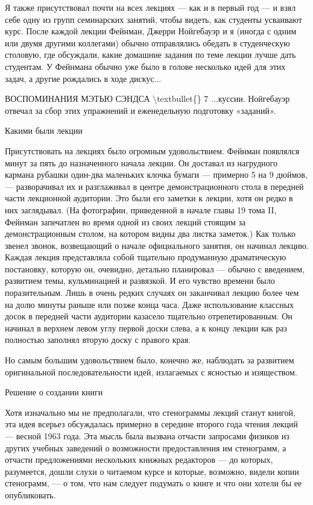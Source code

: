 \documentclass[10pt,oneside]{article}
\begin{document}
Я также присутствовал почти на всех лекциях --- как и в первый год --- и взял себе одну из групп семинарских занятий, чтобы видеть, как студенты усваивают курс. После каждой лекции Фейнман, Джерри Нойгебауэр и я (иногда с одним или двумя другими коллегами) обычно отправлялись обедать в студенческую столовую, где обсуждали, какие домашние задания по теме лекции лучше дать студентам. У Фейнмана обычно уже было в голове несколько идей для этих задач, а другие рождались в ходе дискус...\par

ВОСПОМИНАНИЯ МЭТЬЮ СЭНДСА \textbackslash{}textbullet\{\} 7 ...куссии. Нойгебауэр отвечал за сбор этих упражнений и еженедельную подготовку «заданий».\par

Какими были лекции\par

Присутствовать на лекциях было огромным удовольствием. Фейнман появлялся минут за пять до назначенного начала лекции. Он доставал из нагрудного кармана рубашки один-два маленьких клочка бумаги --- примерно 5 на 9 дюймов, --- разворачивал их и разглаживал в центре демонстрационного стола в передней части лекционной аудитории. Это были его заметки к лекции, хотя он редко в них заглядывал. (На фотографии, приведенной в начале главы 19 тома II, Фейнман запечатлен во время одной из своих лекций стоящим за демонстрационным столом, на котором видны два листка заметок.) Как только звенел звонок, возвещающий о начале официального занятия, он начинал лекцию. Каждая лекция представляла собой тщательно продуманную драматическую постановку, которую он, очевидно, детально планировал --- обычно с введением, развитием темы, кульминацией и развязкой. И его чувство времени было поразительным. Лишь в очень редких случаях он заканчивал лекцию более чем на долю минуты раньше или позже конца часа. Даже использование классных досок в передней части аудитории казасело тщательно отрепетированным. Он начинал в верхнем левом углу первой доски слева, а к концу лекции как раз полностью заполнял вторую доску с правого края.\par

Но самым большим удовольствием было, конечно же, наблюдать за развитием оригинальной последовательности идей, излагаемых с ясностью и изяществом.\par

Решение о создании книги\par

Хотя изначально мы не предполагали, что стенограммы лекций станут книгой, эта идея всерьез обсуждалась примерно в середине второго года чтения лекций --- весной 1963 года. Эта мысль была вызвана отчасти запросами физиков из других учебных заведений о возможности предоставления им стенограмм, а отчасти предложениями нескольких книжных редакторов --- до которых, разумеется, дошли слухи о читаемом курсе и которые, возможно, видели копии стенограмм, --- о том, что нам следует подумать о книге и что они хотели бы ее опубликовать.\par
\end{document}
